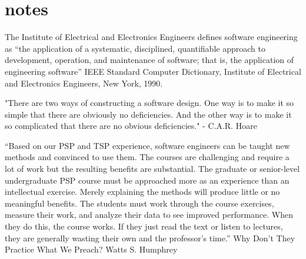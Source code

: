\chapter{notes}

The Institute of Electrical and Electronics Engineers defines software engineering as 
“the application of a systematic, disciplined, quantifiable approach to development, 
operation, and maintenance of software; that is, the application of engineering software”
IEEE Standard Computer Dictionary, Institute
of Electrical and Electronics Engineers, New
York, 1990.

"There are two ways of constructing a software design. One way is to make it so simple 
that there are obviously no deficiencies. And the other way is to make it so complicated that
there are no obvious deficiencies."
- C.A.R. Hoare

``Based on our PSP and TSP experience, software engineers can be taught new methods and
convinced to use them. The courses are challenging and require a lot of work but the 
resulting benefits are substantial. The graduate or senior-level undergraduate PSP 
course must be approached more as an experience than an intellectual exercise. 
Merely explaining the methods will produce little or no meaningful benefits. 
The students must work through the course exercises, measure their work, and 
analyze their data to see improved performance. When they do this, the course works. 
If they just read the text or listen to lectures, they are generally wasting their 
own and the professor's time.''
Why Don't They Practice What We Preach?
Watts S. Humphrey

